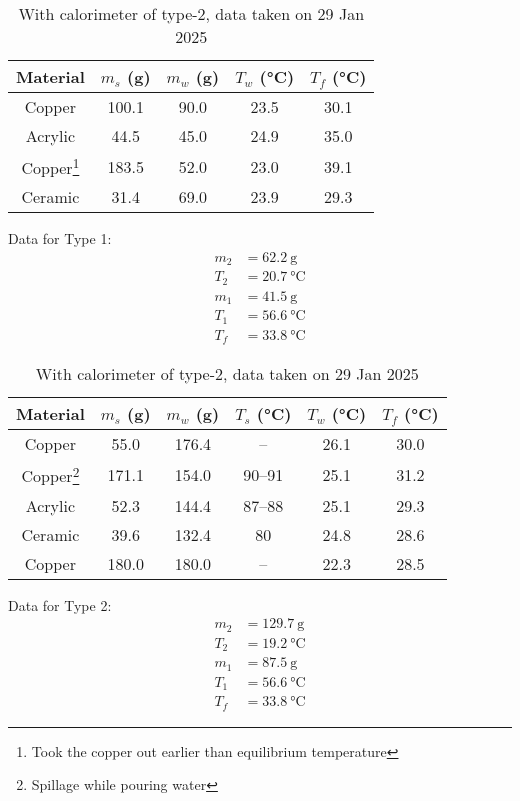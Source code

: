 \documentclass[%
 sor,
 jor,
 amsmath,amssymb,
 reprint,%
]{revtex4-2}
\begin{document}
\begin{table}[ht]
\centering
    \begin{minipage}[b]{0.48\hsize}\centering
\begin{tabular}{|c|c|c|c|c|}
\hline
\textbf{Material} & \textbf{$m_s$ (\si{\gram})} & \textbf{$m_w$ (\si{\gram})} & \textbf{$T_w$ (\si{\celsius})} & \textbf{$T_f$ (\si{\celsius})} \\
\hline
Copper & 100.1 & 90.0 & 23.5 & 30.1 \\
Acrylic & 44.5 & 45.0 & 24.9 & 35.0 \\ %
Copper\footnote{Took the copper out earlier than equilibrium temperature} & 183.5 & 52.0 & 23.0 & 39.1 \\ 
Ceramic & 31.4 & 69.0 & 23.9 & 29.3 \\
\hline
\end{tabular}
\caption{With calorimeter of type-1, data was taken on 23 Jan 2025}
\label{tab:table1}
\vspace{0.5cm}Data for Type 1:
\[
\boxed{
\begin{aligned}
m_2 &= 62.2~\si{\gram} \\
T_2 &= 20.7~\si{\celsius} \\
m_1 &= 41.5~\si{\gram} \\
T_1 &= 56.6~\si{\celsius} \\
T_f &= 33.8~\si{\celsius}
\end{aligned}
}
\]

    \end{minipage}
\hfill\vline\hfill
    \begin{minipage}[b]{0.48\hsize}\centering
\begin{tabular}{|c|c|c|c|c|c|}
\hline
\textbf{Material} & \textbf{$m_s$ (\si{\gram})} & \textbf{$m_w$ (\si{\gram})} & \textbf{$T_s$ (\si{\celsius})} & \textbf{$T_w$ (\si{\celsius})} & \textbf{$T_f$ (\si{\celsius})} \\
\hline
Copper & 55.0 & 176.4 & \multicolumn{1}{c}{--} & 26.1 & 30.0 \\ %
Copper\footnote{Spillage while pouring water} & 171.1 & 154.0 & 90--91 & 25.1 & 31.2 \\
Acrylic & 52.3 & 144.4 & 87--88 & 25.1 & 29.3 \\ %
Ceramic & 39.6 & 132.4 & 80 & 24.8 & 28.6 \\
Copper & 180.0 & 180.0 & \multicolumn{1}{c}{--} & 22.3 & 28.5 \\
\hline
\end{tabular}
\caption{With calorimeter of type-2, data taken on 29 Jan 2025}
\label{tab:table2}
\vspace{0.5cm}Data for Type 2:\\
\[
\boxed{
\begin{aligned}
m_2 &= 129.7~\si{\gram} \\
T_2 &= 19.2~\si{\celsius} \\
m_1 &= 87.5~\si{\gram} \\
T_1 &= 56.6~\si{\celsius} \\
T_f &= 33.8~\si{\celsius}
\end{aligned}
}
\]
    \end{minipage}
\end{table}
\end{document}
